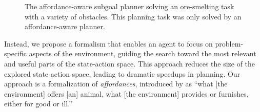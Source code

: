 \documentclass[]{article}
\begin{document}
      
      \begin{figure}
\centering
%
%
%
%
  \caption{The affordance-aware subgoal planner solving an ore-smelting task with a variety of obstacles. This planning task was
  only solved by an affordance-aware planner.}
  \label{fig:epicworld}
\end{figure}


Instead, we propose a formalism that enables an agent to focus on
problem-specific aspects of the environment, guiding the search toward
the most relevant and useful parts of the state-action space.  This
approach reduces the size of the explored state action space, leading
to dramatic speedups in planning.  Our approach is a formalization of
{\em affordances}, introduced by \citet{gibson77} as ``what [the
  environment] offers [an] animal, what [the environment] provides or
furnishes, either for good or ill.''
\end{document}
